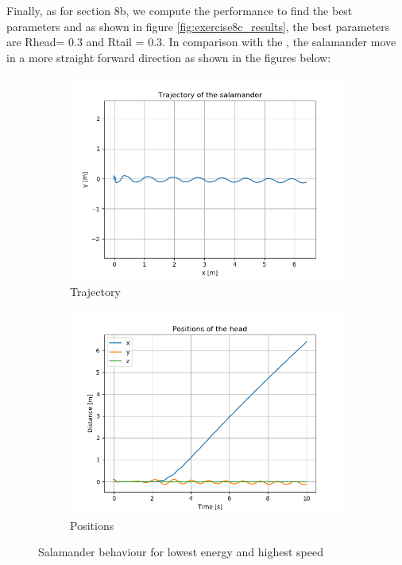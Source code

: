 \documentclass{cmc}
\begin{document}
Finally, as for section 8b, we compute the performance to find the best parameters and as shown in figure \ref{fig:exercise8c_results}, the best parameters are Rhead= 0.3 and Rtail = 0.3.
In comparison with the , the salamander move in a more straight forward direction as shown in the figures below:
\begin{figure}[H] 
  \begin{subfigure}[b]{0.5\linewidth}
    \centering
    \includegraphics[width=0.9\linewidth]{figures/Trajectory_8c.png} 
    \caption{Trajectory} 
    \label{fig:exercise8c_behaviour:a} 
  \end{subfigure}%
  \begin{subfigure}[b]{0.5\linewidth}
    \centering
    \includegraphics[width=0.9\linewidth]{figures/Positions_8c.png} 
    \caption{Positions} 
    \label{fig:exercise8c_behaviour:b} 
  \end{subfigure}
  \caption{Salamander behaviour for lowest energy and highest speed}
  \label{fig:exercise8c_behaviour} 
\end{figure}
\end{document}
